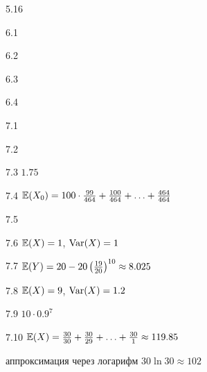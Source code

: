 \protect \hypertarget {soln:5.16}{}
\begin{solution}{{5.16}}
\end{solution}
\protect \hypertarget {soln:6.1}{}
\begin{solution}{{6.1}}

\end{solution}
\protect \hypertarget {soln:6.2}{}
\begin{solution}{{6.2}}
\end{solution}
\protect \hypertarget {soln:6.3}{}
\begin{solution}{{6.3}}

\end{solution}
\protect \hypertarget {soln:6.4}{}
\begin{solution}{{6.4}}

\end{solution}
\protect \hypertarget {soln:7.1}{}
\begin{solution}{{7.1}}
\end{solution}
\protect \hypertarget {soln:7.2}{}
\begin{solution}{{7.2}}
\end{solution}
\protect \hypertarget {soln:7.3}{}
\begin{solution}{{7.3}}
$1.75$
\end{solution}
\protect \hypertarget {soln:7.4}{}
\begin{solution}{{7.4}}
  $\mathbb{E}(X_0)=100\cdot \frac{99}{464} + \frac{100}{464} + \ldots + \frac{464}{464}$
\end{solution}
\protect \hypertarget {soln:7.5}{}
\begin{solution}{{7.5}}
\end{solution}
\protect \hypertarget {soln:7.6}{}
\begin{solution}{{7.6}}
$\mathbb{E}(X)=1$, $\operatorname{Var}(X)=1$
\end{solution}
\protect \hypertarget {soln:7.7}{}
\begin{solution}{{7.7}}
$\mathbb{E}(Y)=20-20 \left( \frac{19}{20} \right)^{10}\approx 8.025$
\end{solution}
\protect \hypertarget {soln:7.8}{}
\begin{solution}{{7.8}}
$\mathbb{E}(X)=9$, $\operatorname{Var}(X)=1.2$
\end{solution}
\protect \hypertarget {soln:7.9}{}
\begin{solution}{{7.9}}
  $10 \cdot 0.9^7$
\end{solution}
\protect \hypertarget {soln:7.10}{}
\begin{solution}{{7.10}}
  $\mathbb{E}(X)=\frac{30}{30} + \frac{30}{29} + \ldots + \frac{30}{1}\approx 119.85$

  аппроксимация через логарифм $30 \ln 30 \approx 102$
\end{solution}
